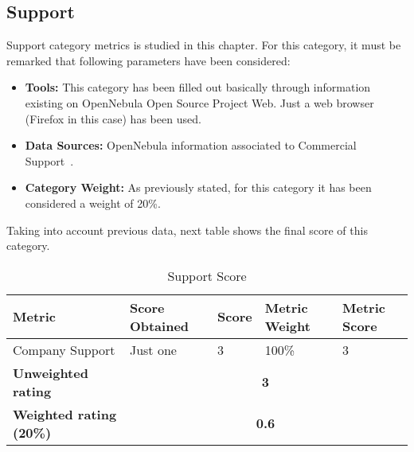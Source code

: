 \documentclass[11pt]{article}
\begin{document}
\subsection{Support}
Support category metrics is studied in this chapter. For this category, it must be remarked that following parameters have been considered:
\begin{itemize}\itemsep0pt
\item{\textbf{Tools:}} This category has been filled out basically through information existing on OpenNebula Open Source Project Web. Just a web browser (Firefox in this case) has been used.
\item{\textbf{Data Sources:}} OpenNebula information associated to Commercial Support~\cite{OPNEB01}.
\item{\textbf{Category Weight:}} As previously stated, for this category it has been considered a weight of 20\%.
\end{itemize}
Taking into account previous data, next table shows the final score of this category.
\begin{table}[H]
  \begin{center}
    \begin{tabular}{ | p{4cm} | p{3cm} | l | p{1.2cm} | p{1.2cm} | }
    \toprule
    \textbf{Metric} & \textbf{Score Obtained} & \textbf{Score} & \textbf{Metric Weight} & \textbf{Metric Score}\\
    \hline
    Company Support & Just one & 3 & 100\% & 3\\
    \midrule
    \textbf{Unweighted rating} & \multicolumn{4}{c|}{\textbf{3}}\\
    \hline
    \textbf{Weighted rating (20\%)} & \multicolumn {4}{c|}{\textbf{0.6}}\\
    \bottomrule
    \end{tabular}
    \caption{Support Score}
    \label{tab:supp_score}
  \end{center}
\end{table}
\end{document}
